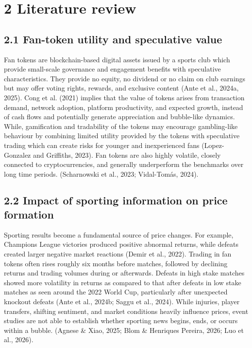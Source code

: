 \documentclass[11pt,a4paper,onecolumn]{article}
\begin{document}
\section{2 Literature review}

\subsection{2.1 Fan-token utility and speculative value}

Fan tokens are blockchain-based digital assets issued by a sports club which provide small-scale governance and engagement benefits with speculative characteristics. They provide no equity, no dividend or no claim on club earnings but may offer voting rights, rewards, and exclusive content (Ante et al., 2024a, 2025). Cong et al. (2021) implies that the value of tokens arises from transaction demand, network adoption, platform productivity, and expected growth, instead of cash flows and potentially generate appreciation and bubble-like dynamics. While, gamification and tradability of the tokens may encourage gambling-like behaviour by combining limited utility provided by the tokens with speculative trading which can create risks for younger and inexperienced fans (Lopez-Gonzalez and Griffiths, 2023). Fan tokens are also highly volatile, closely connected to cryptocurrencies, and generally underperform the benchmarks over long time periods. (Scharnowski et al., 2023; Vidal-Tomás, 2024).

\subsection{2.2 Impact of sporting information on price formation}

Sporting results become a fundamental source of price changes. For example, Champions League victories produced positive abnormal returns, while defeats created larger negative market reactions (Demir et al., 2022). Trading in fan tokens often rises roughly six months before matches, followed by declining returns and trading volumes during or afterwards. Defeats in high stake matches showed more volatility in returns as compared to that after defeats in low stake matches as seen around the 2022 World Cup, particularly after unexpected knockout defeats (Ante et al., 2024b; Saggu et al., 2024). While injuries, player transfers, shifting sentiment, and market conditions heavily influence prices, event studies are not able to  establish whether sporting news begins, ends, or occurs within a bubble. (Agnese \& Xiao, 2025; Blom \& Henriques Pereira, 2026; Luo et al., 2026).
\end{document}
